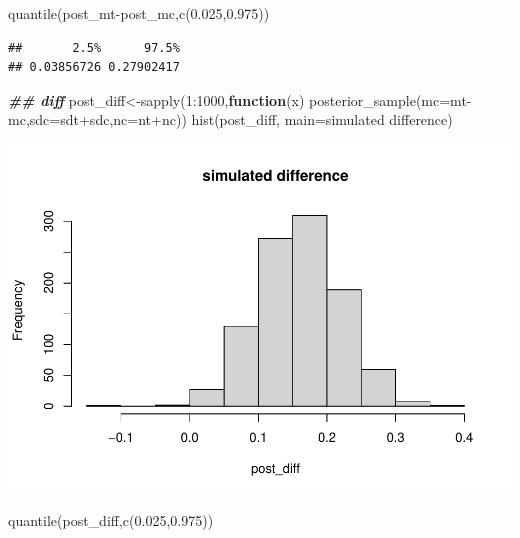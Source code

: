 \documentclass[
]{book}
\newenvironment{Shaded}{\begin{snugshade}}{\end{snugshade}}
\newcommand{\AttributeTok}[1]{\textcolor[rgb]{0.77,0.63,0.00}{#1}}
\newcommand{\ControlFlowTok}[1]{\textcolor[rgb]{0.13,0.29,0.53}{\textbf{#1}}}
\newcommand{\DecValTok}[1]{\textcolor[rgb]{0.00,0.00,0.81}{#1}}
\newcommand{\DocumentationTok}[1]{\textcolor[rgb]{0.56,0.35,0.01}{\textbf{\textit{#1}}}}
\newcommand{\FloatTok}[1]{\textcolor[rgb]{0.00,0.00,0.81}{#1}}
\newcommand{\FunctionTok}[1]{\textcolor[rgb]{0.00,0.00,0.00}{#1}}
\newcommand{\NormalTok}[1]{#1}
\newcommand{\OtherTok}[1]{\textcolor[rgb]{0.56,0.35,0.01}{#1}}
\newcommand{\SpecialCharTok}[1]{\textcolor[rgb]{0.00,0.00,0.00}{#1}}
\newcommand{\StringTok}[1]{\textcolor[rgb]{0.31,0.60,0.02}{#1}}
\theoremstyle{definition}
\theoremstyle{definition}
\theoremstyle{definition}
\theoremstyle{definition}
\theoremstyle{remark}
\begin{document}
\begin{Shaded}
\begin{Highlighting}[]
         \FunctionTok{quantile}\NormalTok{(post\_mt}\SpecialCharTok{{-}}\NormalTok{post\_mc,}\FunctionTok{c}\NormalTok{(}\FloatTok{0.025}\NormalTok{,}\FloatTok{0.975}\NormalTok{))}
\end{Highlighting}
\end{Shaded}

\begin{verbatim}
##       2.5%      97.5% 
## 0.03856726 0.27902417
\end{verbatim}

\begin{Shaded}
\begin{Highlighting}[]
  \DocumentationTok{\#\# diff}
\NormalTok{         post\_diff}\OtherTok{\textless{}{-}}\FunctionTok{sapply}\NormalTok{(}\DecValTok{1}\SpecialCharTok{:}\DecValTok{1000}\NormalTok{,}\ControlFlowTok{function}\NormalTok{(x) }\FunctionTok{posterior\_sample}\NormalTok{(}\AttributeTok{mc=}\NormalTok{mt}\SpecialCharTok{{-}}\NormalTok{mc,}\AttributeTok{sdc=}\NormalTok{sdt}\SpecialCharTok{+}\NormalTok{sdc,}\AttributeTok{nc=}\NormalTok{nt}\SpecialCharTok{+}\NormalTok{nc))}
    \FunctionTok{hist}\NormalTok{(post\_diff, }\AttributeTok{main=}\StringTok{\textquotesingle{}simulated difference\textquotesingle{}}\NormalTok{)}
\end{Highlighting}
\end{Shaded}

\includegraphics{_main_files/figure-latex/unnamed-chunk-32-2.pdf}

\begin{Shaded}
\begin{Highlighting}[]
             \FunctionTok{quantile}\NormalTok{(post\_diff,}\FunctionTok{c}\NormalTok{(}\FloatTok{0.025}\NormalTok{,}\FloatTok{0.975}\NormalTok{))}
\end{Highlighting}
\end{Shaded}
\end{document}
